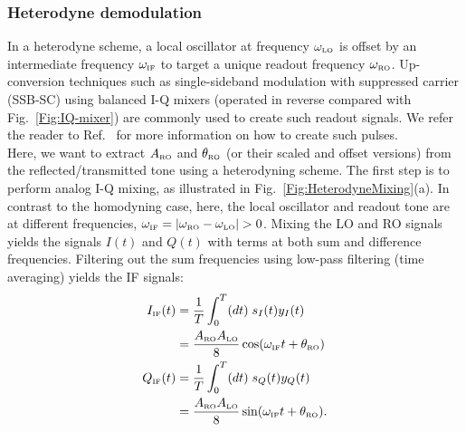\documentclass[aip,apr,twocolumn,showpacs,superscriptaddress,groupedaddress,nofootinbib,reprint]{revtex4-1}  %
\begin{document}
\subsubsection{Heterodyne demodulation}
In a heterodyne scheme, a local oscillator at frequency $\omega_{\mbox{\tiny{LO}}}$ is offset by an intermediate frequency $\omega_{\mbox{\tiny{IF}}}$ to target a unique readout frequency $\omega_{\mbox{\tiny{RO}}}$. Up-conversion techniques such as single-sideband modulation with suppressed carrier (SSB-SC) using balanced I-Q mixers (operated in reverse compared with Fig.~\ref{Fig:IQ-mixer}) are commonly used to create such readout signals. We refer the reader to Ref.~ for more information on how to create such pulses.\\
\indent Here, we want to extract $A_{\mbox{\tiny{RO}}}$ and $\theta_{\mbox{\tiny{RO}}}$ (or their scaled and offset versions) from the reflected/transmitted tone using a heterodyning scheme. The first step is to perform analog I-Q mixing, as illustrated in Fig.~\ref{Fig:HeterodyneMixing}(a).
In contrast to the homodyning case, here, the local oscillator and readout tone are at different frequencies, $\omega_{\mbox{\tiny{IF}}} = |\omega_{\mbox{\tiny{RO}}} - \omega_{\mbox{\tiny{LO}}}| > 0$. Mixing the LO and RO signals yields the signals $I(t)$ and $Q(t)$ with terms at both sum and difference frequencies. Filtering out the sum frequencies using low-pass filtering (time averaging) yields the IF signals:
\begin{align}
  I_{\mbox{\tiny{IF}}}(t) &= \frac{1}{T}\int_0^T (dt) \; s_I(t) y_I(t) \nonumber \\
            &= \frac{A_{\mbox{\tiny{RO}}}A_{\mbox{\tiny{LO}}}}{8} \cos (\omega_{\mbox{\tiny{IF}}}t + \theta_{\mbox{\tiny{RO}}}) \\
  Q_{\mbox{\tiny{IF}}}(t) &= \frac{1}{T}\int_0^T (dt) \; s_Q(t) y_Q(t) \nonumber \\
            &= \frac{A_{\mbox{\tiny{RO}}}A_{\mbox{\tiny{LO}}}}{8} \sin (\omega_{\mbox{\tiny{IF}}}t + \theta_{\mbox{\tiny{RO}}}).
\end{align}
\end{document}
